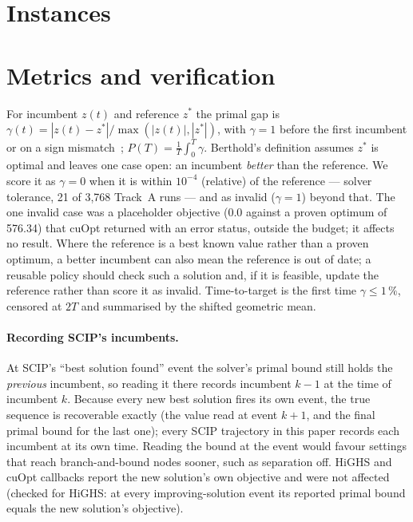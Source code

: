 \section{Instances}\label{app:data}



\section{Metrics and verification}\label{app:metrics}
For incumbent $z(t)$ and reference $z^\ast$ the primal gap is $\gamma(t)=|z(t)-z^\ast|/\max(|z(t)|,|z^\ast|)$, with
$\gamma=1$ before the first incumbent or on a sign mismatch~\citep{berthold2013primal}; $P(T)=\frac1T\int_0^T\gamma$.
Berthold's definition assumes $z^\ast$ is optimal and leaves one case open: an incumbent \emph{better} than the
reference. We score it as $\gamma=0$ when it is within $10^{-4}$ (relative) of the reference ---
solver tolerance, 21 of 3{,}768 Track~A runs --- and as invalid ($\gamma=1$) beyond that. The one invalid case was a
placeholder objective (0.0 against a proven optimum of 576.34) that cuOpt returned with an error status, outside
the budget; it affects no result. Where the reference is a best known value rather than a proven optimum, a better
incumbent can also mean the reference is out of date; a reusable policy should check such a solution and, if it is
feasible, update the reference rather than score it as invalid. Time-to-target is the first time $\gamma\le 1\,\%$, censored at
$2T$ and summarised by the shifted geometric mean.

\paragraph{Recording SCIP's incumbents.} At SCIP's ``best solution found'' event the solver's primal bound still
holds the \emph{previous} incumbent, so reading it there records incumbent $k-1$ at the time of incumbent $k$. Because
every new best solution fires its own event, the true sequence is recoverable exactly (the value read at event $k+1$, and
the final primal bound for the last one); every SCIP trajectory in this paper records each incumbent at its own time.
Reading the bound at the event would favour settings that reach branch-and-bound nodes sooner, such as separation off.
HiGHS and cuOpt callbacks report the new solution's own objective and were not affected (checked for HiGHS: at every
improving-solution event its reported primal bound equals the new solution's objective).

